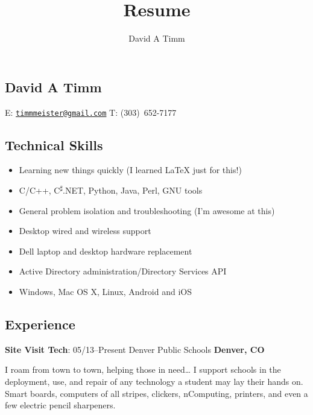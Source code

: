 \documentclass[letterpaper,12pt]{article}
\author{David A Timm}
\title{Resume}
\begin{document}
\begin{center}
\section{David A Timm}

E: \href{mailto:timmmeister@gmail.com?subject=You%27re%20hired!}
{\nolinkurl{timmmeister@gmail.com}}
T: \mbox{(303) 652-7177}
\end{center}

\begin{center}
\subsection{Technical Skills}
\end{center}

\begin{itemize}
\item Learning new things quickly (I learned \LaTeX{} just for this!)
\item C/C++, C\textsuperscript{{$\sharp$}}.NET, Python, Java, Perl, GNU tools
\item General problem isolation and troubleshooting (I'm awesome at this)
\item Desktop wired and wireless support
\item Dell laptop and desktop hardware replacement
\item Active Directory administration/Directory Services API
\item Windows, Mac OS X, Linux, Android and iOS
\end{itemize}

\begin{center}
\subsection{Experience}
\end{center}

\begin{flushleft}
\textbf{Site Visit Tech}: 05/13--Present Denver Public Schools
\textbf{Denver, CO}
\end{flushleft}

I roam from town to town, helping those in need\ldots{} I support schools in the
deployment, use, and repair of any technology a student may lay their hands on.
Smart boards, computers of all stripes, clickers, nComputing, printers, and
even a few electric pencil sharpeners. 
\end{document}
